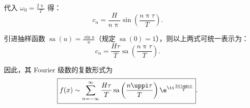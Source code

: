 \begin{solution}
    代入 $\omega_0 = \frac{2\uppi}{T}$ 得：
    \begin{equation}
        c_n = \frac{H}{n\uppi} \sin\left( \frac{n\uppi\tau}{T} \right).
    \end{equation}

    引进抽样函数 $\operatorname{sa}(u) = \frac{\sin u}{u}$（规定 $\operatorname{sa}(0) = 1$），则以上两式可统一表示为：
    \begin{equation}
        c_n = \frac{H\tau}{T} \operatorname{sa}\left( \frac{n\uppi\tau}{T} \right).
    \end{equation}

    因此，其 Fourier 级数的复数形式为
    \begin{equation}
        \boxed{f(x) \sim \sum_{n=-\infty}^{\infty} \frac{H\tau}{T} \operatorname{sa}\left( \frac{n\uppi\tau}{T} \right) \e^{\ii \frac{2n\uppi x}{T}}}.
    \end{equation}
\end{solution}

\endinput
